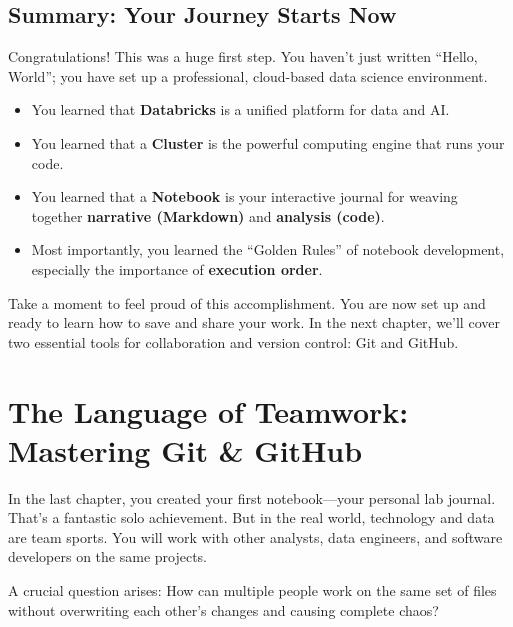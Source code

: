 \documentclass[
  letterpaper,
  DIV=11,
  numbers=noendperiod]{scrreprt}
\providecommand{\tightlist}{%
  \setlength{\itemsep}{0pt}\setlength{\parskip}{0pt}}
\begin{document}
\section*{Summary: Your Journey Starts
Now}\label{summary-your-journey-starts-now}


Congratulations! This was a huge first step. You haven't just written
``Hello, World''; you have set up a professional, cloud-based data
science environment.

\begin{itemize}
\tightlist
\item
  You learned that \textbf{Databricks} is a unified platform for data
  and AI.
\item
  You learned that a \textbf{Cluster} is the powerful computing engine
  that runs your code.
\item
  You learned that a \textbf{Notebook} is your interactive journal for
  weaving together \textbf{narrative (Markdown)} and \textbf{analysis
  (code)}.
\item
  Most importantly, you learned the ``Golden Rules'' of notebook
  development, especially the importance of \textbf{execution order}.
\end{itemize}

Take a moment to feel proud of this accomplishment. You are now set up
and ready to learn how to save and share your work. In the next chapter,
we'll cover two essential tools for collaboration and version control:
Git and GitHub.


\chapter{The Language of Teamwork: Mastering Git \&
GitHub}\label{the-language-of-teamwork-mastering-git-github}

In the last chapter, you created your first notebook---your personal lab
journal. That's a fantastic solo achievement. But in the real world,
technology and data are team sports. You will work with other analysts,
data engineers, and software developers on the same projects.

A crucial question arises: How can multiple people work on the same set
of files without overwriting each other's changes and causing complete
chaos?
\end{document}
